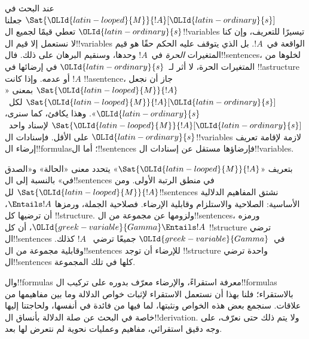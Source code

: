 \documentclass[../../../include/open-logic-section]{subfiles}
\begin{document}


عند البحث في $\Sat{\OLId{latin-looped}{M}}{!A}[\OLId{latin-ordinary}{s}]$ جعلنا $\OLId{latin-ordinary}{s}$ تعطي قيمًا لجميع
ال!!{variable}s تيسيرًا للتعريف، وإن كنا لا نستعمل إلا قيم
ال!!{variable}s الواقعة في~$!A$. بل الذي يتوقف عليه الحكم حقًا
هو قيم المتغيرات \emph{الحرة} في~$!A$ وحدها، وسنقيم البرهان على
ذلك. فال!!{sentence}s، لخلوها من المتغيرات الحرة، لا أثر
لـ~$\OLId{latin-ordinary}{s}$ في إرضائها في !!a{structure} أو عدمه. وإذا كانت $!A$
!!a{sentence}، جاز أن نجعل $\Sat{\OLId{latin-looped}{M}}{!A}$ بمعنى
«$\Sat{\OLId{latin-looped}{M}}{!A}[\OLId{latin-ordinary}{s}]$ لكل~$\OLId{latin-ordinary}{s}$». وهذا يكافئ، كما سنرى،
$\Sat{\OLId{latin-looped}{M}}{!A}[\OLId{latin-ordinary}{s}]$ لإسناد واحد~$\OLId{latin-ordinary}{s}$ على الأقل. فإسنادات
ال!!{variable}s لازمة لإقامة تعريف إرضاء ال!!{formula}s؛ أما
ال!!{sentence}s فإرضاؤها مستقل عن إسنادات ال!!{variable}s.

بتعريف «$\Sat{\OLId{latin-looped}{M}}{!A}$» يتحدد معنى «الحالة» و«الصدق في» بالنسبة
إلى ال!!{sentence}s في منطق الرتبة الأولى. ومن
$\Sat{\OLId{latin-looped}{M}}{!A}$ لل!!{sentence}s نشتق المفاهيم الدلالية الأساسية:
الصلاحية والاستلزام وقابلية الإرضاء. فصلاحية الجملة، ورمزها
$\Entails !A$، أن ترضيها كل !!{structure}. ولزومها عن
مجموعة من ال!!{sentence}s، ورمزه $\OLId{greek-variable}{Gamma} \Entails !A$، أن كل
!!{structure} ترضي ال!!{sentence}s في~$\OLId{greek-variable}{Gamma}$ جميعًا ترضي
~$!A$ كذلك. وقابلية مجموعة من ال!!{sentence}s للإرضاء أن توجد
!!{structure} واحدة ترضي ال!!{sentence}s كلها في تلك المجموعة.

وال!!{formula}s معرفة استقراءً، والإرضاء معرّف بدوره على تركيب
ال!!{formula}s بالاستقراء؛ فلنا بهذا أن نستعمل الاستقراء لإثبات
خواص الدلالة وما بين مفاهيمها من علاقات. سنجمع بعض هذه الخواص
ونثبتها، لما فيها من فائدة في أنفسها، ولحاجتنا إليها خاصة في
البحث عن صلة الدلالة بأنساق ال!!{derivation}. ولا يتم ذلك حتى
نعرّف، على وجه دقيق استقرائي، مفاهيم وعمليات نحوية لم نتعرض لها
بعد.
\end{document}
